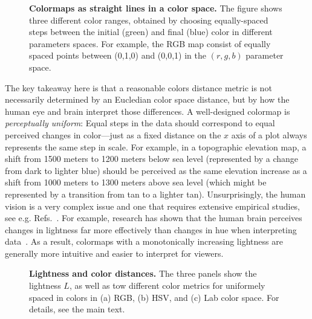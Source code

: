 \begin{figure}
\captionsetup{format = sidebyside, indention = 0cm} 
\begin{minipage}[t]{0.4\textwidth}
	\vspace{-5pt}
	\caption{\textbf{Colormaps as straight lines in a color space.} The figure shows three different color ranges, obtained by choosing equally-spaced steps between the initial (green) and final (blue) color in different parameters spaces. For example, the RGB map consist of equally spaced points between (0,1,0) and (0,0,1) in the $(r,g,b)$ parameter space.}
	\label{fig:colorspaces}
\end{minipage}\hfill 
\begin{minipage}[t]{0.55\textwidth}
	\centering 
	\vspace{0pt}
	
\end{minipage}
\end{figure} 


The key takeaway here is that a reasonable colors distance metric is not necessarily determined by an Eucledian color space distance, but by how the human eye and brain interpret those differences. A well-designed colormap is \emph{perceptually uniform}: Equal steps in the data should correspond to equal perceived changes in color---just as a fixed distance on the $x$ axis of a plot always represents the same step in scale. For example, in a topographic elevation map, a shift from 1500 meters to 1200 meters below sea level (represented by a change from dark to lighter blue) should be perceived as the same elevation increase as a shift from 1000 meters to 1300 meters above sea level (which might be represented by a transition from tan to a lighter tan).
Unsurprisingly, the human vision is a very complex issue and one that requires extensive empirical studies, see e.g. Refs.~\cite{rogowitz1996,mullen1985,crameri2020}. For example, research has shown that the human brain perceives changes in lightness far more effectively than changes in hue when interpreting data~\cite{rogowitz1996}. As a result, colormaps with a monotonically increasing lightness are generally more intuitive and easier to interpret for viewers.

\begin{figure}
	\centering
	
	\caption{\textbf{Lightness and color distances.} The three panels show the lightness $L$, as well as tow different color metrics for uniformely spaced in colors in (a) RGB, (b) HSV, and (c) Lab color space. For details, see the main text.}
	\label{fig:colordiffs}
\end{figure}


